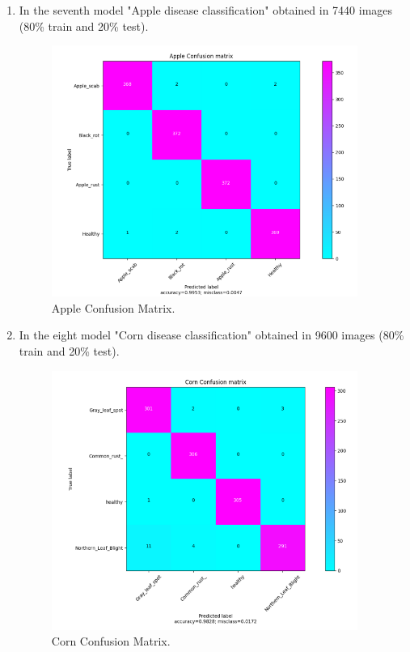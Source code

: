 \begin{enumerate}
  \item In the seventh model "Apple disease classification" obtained in 7440 images (80\% train and 20\% test).
    \begin{figure}[H]
      \centering
      \includegraphics[width=10cm]{photos/chapter05/15.png}
      \caption{Apple Confusion Matrix.}
    \end{figure}

  \item In the eight model "Corn disease classification" obtained in 9600 images (80\% train and 20\% test).
    \begin{figure}[H]
      \centering
      \includegraphics[width=10cm]{photos/chapter05/16.png}
      \caption{Corn Confusion Matrix.}
      \label{fig:cornConf}
    \end{figure}
\end{enumerate}

